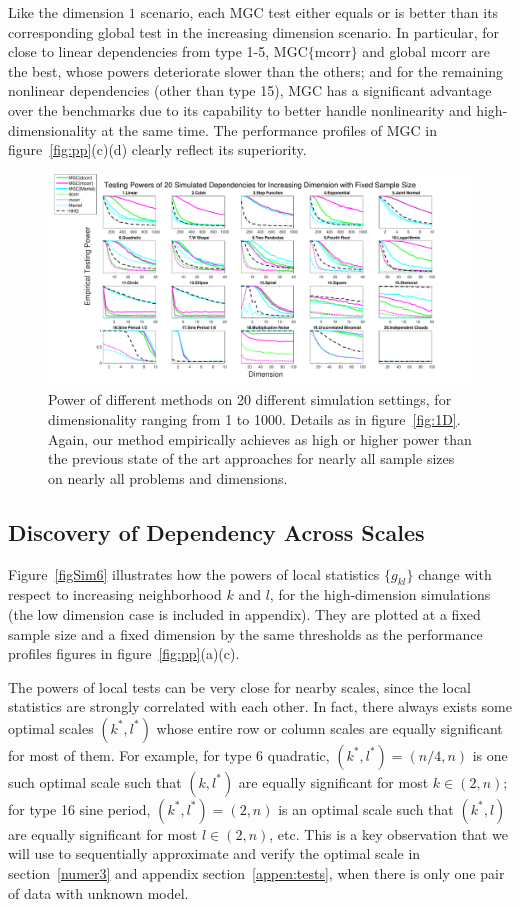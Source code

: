 \documentclass[11pt]{article}
\begin{document}
Like the dimension $1$ scenario, each MGC test either equals or is better than its corresponding global test in the increasing dimension scenario. In particular, for close to linear dependencies from type 1-5, MGC$\{$mcorr$\}$ and global mcorr are the best, whose powers deteriorate slower than the others; and for the remaining nonlinear dependencies (other than type 15), MGC has a significant advantage over the benchmarks due to its capability to better handle nonlinearity and high-dimensionality at the same time. The performance profiles of MGC in figure~\ref{fig:pp}(c)(d) clearly reflect its superiority.

\begin{figure}[htbp]
\includegraphics[width=1.0\textwidth]{../Figures/Fig5}
\caption{Power of different methods on 20 different simulation settings, for dimensionality ranging from 1 to 1000.  Details as in figure~\ref{fig:1D}.
Again, our method empirically achieves as high or higher power than the previous state of the art approaches for nearly all sample sizes on nearly all problems and dimensions.
}
\label{fig:nD}
\end{figure}

\subsection{Discovery of Dependency Across Scales}
\label{main3}

Figure~\ref{figSim6} illustrates how the powers of local statistics $\{g_{kl}\}$ change with respect to increasing neighborhood $k$ and $l$, for the high-dimension simulations (the low dimension case is included in appendix). They are plotted at a fixed sample size and a fixed dimension by the same thresholds as the performance profiles figures in figure~\ref{fig:pp}(a)(c). 

The powers of local tests can be very close for nearby scales, since the local statistics are strongly correlated with each other. In fact, there always exists some optimal scales $(k^{*},l^{*})$ whose entire row or column scales are equally significant for most of them. For example, for type 6 quadratic, $(k^{*},l^{*})=(n/4, n)$ is one such optimal scale such that $(k,l^{*})$ are equally significant for most $k \in (2,n)$; for type 16 sine period, $(k^{*},l^{*})=(2, n)$ is an optimal scale such that $(k^{*},l)$ are equally significant for most $l \in (2,n)$, etc. This is a key observation that we will use to sequentially approximate and verify the optimal scale in section~\ref{numer3} and appendix section~\ref{appen:tests}, when there is only one pair of data with unknown model.
\end{document}
